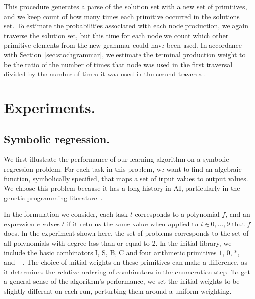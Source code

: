 \documentclass{article}
\begin{document}

This procedure generates a parse of the solution set with a new set of
primitives, and we keep count of how many times each primitive
occurred in the solutions set. To estimate the probabilities
associated with each node production, we again traverse the solution
set, but this time for each node we count which other primitive
elements from the new grammar could have been used. In accordance with
Section~\ref{sec:stochgrammar}, we estimate the terminal production weight
to be the ratio of the number of times that node was used in the first
traversal divided by the number of times it was used in the second
traversal.

\section{Experiments.}
\subsection{Symbolic regression.}
\label{sec:symreg}

We first illustrate the performance of our learning algorithm on a
symbolic regression problem. For each task in this problem, we want to
find an algebraic function, symbolically specified, that maps a set of
input values to output values. We choose this problem because it has a
long history in AI, particularly in the genetic programming
literature~\cite{DBLP:books/daglib/0070933}.

In the formulation we consider, each task $t$ corresponds to a
polynomial $f$, and an expression $e$ solves $t$ if it returns the
same value when applied to $i \in 0, \dots, 9$ that $f$ does. In the
experiment shown here, the set of problems corresponds to the set of
all polynomials with degree less than or equal to 2. In the initial
library, we include the basic combinators I, S, B, C and four
arithmetic primitives $1$, $0$, $*$, and $+$. The choice of initial
weights on these primitives can make a difference, as it determines
the relative ordering of combinators in the enumeration step. To get a
general sense of the algorithm's performance, we set the initial
weights to be slightly different on each run, perturbing them around a
uniform weighting.
\end{document}
